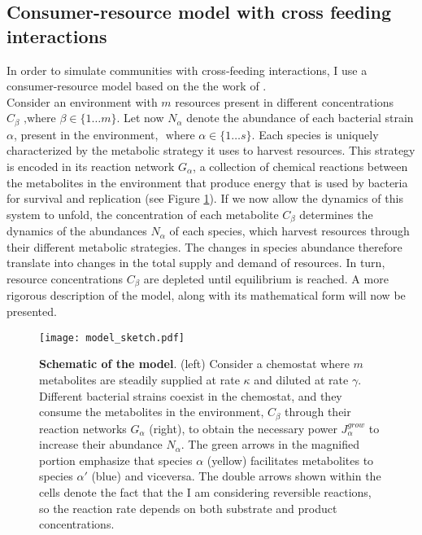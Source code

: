 \documentclass[titlepage,11pt]{article}
\begin{document}
\begin{linenumbers}
\begin{singlespace}
			\subsection{Consumer-resource model with cross feeding interactions}
				In order to simulate communities with cross-feeding interactions, I use a consumer-resource model based on the the work of \citet{Marsland2019}.\\
				Consider an environment with $ m $ resources present in different concentrations $ C_{\beta} \text{ ,where } \beta \in \{1 \dots m\} $. Let now $ N_{\alpha} $ denote the abundance of each bacterial strain $ \alpha $,  present in the environment, $ \text{ where } \alpha \in \{1 \dots s\} $. Each species is uniquely characterized by the metabolic strategy it uses to harvest resources. This strategy is encoded in its reaction network $ G_{\alpha} $, a collection of chemical reactions between the metabolites in the environment that produce energy that is used by bacteria for survival and replication (see Figure \ref{fig:model}). If we now allow the dynamics of this system to unfold, the concentration of each metabolite $ C_\beta $ determines the dynamics of the abundances $ N_\alpha$ of each species, which harvest resources through their different metabolic strategies. The changes in species abundance therefore translate into changes in the total supply and demand of resources. In turn,  resource concentrations $ C_{\beta} $ are depleted until equilibrium is reached. A more rigorous description of the model, along with its mathematical form will now be presented.\\
				\begin{figure}
					\centering
					\texttt{[image: model\_sketch.pdf]}
					\caption{\textbf{Schematic of the model}. (left) Consider a chemostat where $ m $ metabolites are steadily supplied at rate $ \kappa $ and diluted at rate $ \gamma $. Different bacterial strains coexist in the chemostat, and they consume the metabolites in the environment, $ C_{\beta} $ through their reaction networks $ G_{\alpha} $ (right), to obtain the necessary power $ J_{\alpha}^{grow} $ to increase their abundance $ N_{\alpha} $. The green arrows in the magnified portion emphasize that species $ \alpha $ (yellow) facilitates metabolites to species $ \alpha' $ (blue) and viceversa. The double arrows shown within the cells denote the fact that the I am considering reversible reactions, so the reaction rate depends on both substrate and product concentrations.}
					\label{fig:model}
				\end{figure} 

\end{singlespace}
\end{linenumbers}
\end{document}
